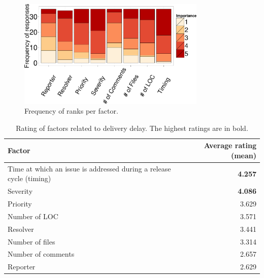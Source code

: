 \begin{sloppypar}
\begin{figure}
	\centering
	\includegraphics[width=0.80\textwidth,keepaspectratio]
	{chapters/chapter5/figures/rank_frequency.pdf}
	\caption{Frequency of ranks per factor.}
	\label{fig:rank_frequency}
\end{figure}

\begin{table}
	\footnotesize
	\centering
	\caption{Rating of factors related to delivery delay. The highest
		ratings are in bold.
		\label{tbl:factors}
	}
	\begin{tabular}{lr}
		\hline 
		\textbf{Factor} & \textbf{Average rating (mean)}\tabularnewline
		\hline 
		\hline 
		Time at which an issue is addressed during a release cycle (timing) & \textbf{4.257}\tabularnewline
		\hline 
		Severity & \textbf{4.086}\tabularnewline
		\hline 
		Priority & 3.629\tabularnewline
		\hline 
		Number of LOC & 3.571\tabularnewline
		\hline 
		Resolver & 3.441\tabularnewline
		\hline 
		Number of files & 3.314\tabularnewline
		\hline 
		Number of comments & 2.657\tabularnewline
		\hline 
		Reporter & 2.629\tabularnewline
		\hline 
	\end{tabular}
\end{table}


\end{sloppypar}
